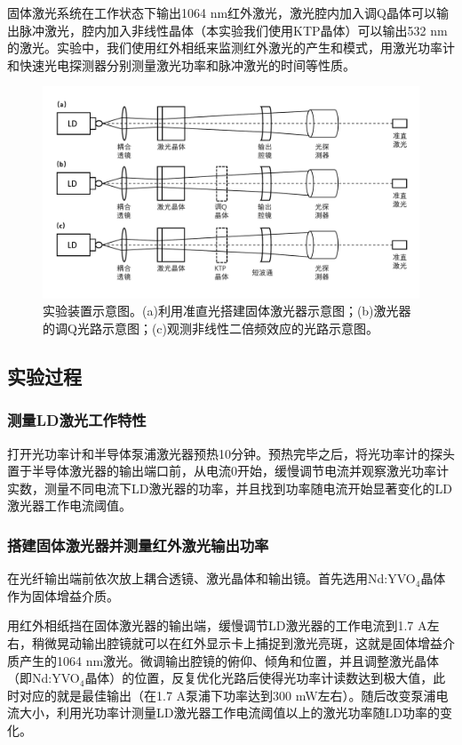 \documentclass{mpltx}
\begin{document}
固体激光系统在工作状态下输出1064 nm红外激光，激光腔内加入调Q晶体可以输出脉冲激光，腔内加入非线性晶体（本实验我们使用KTP晶体）可以输出532 nm的激光。实验中，我们使用红外相纸来监测红外激光的产生和模式，用激光功率计和快速光电探测器分别测量激光功率和脉冲激光的时间等性质。
\begin{figure}[h]
  \centering
  \setlength{\abovecaptionskip}{-0.4cm}
  \includegraphics[width=0.95\linewidth]{fig/apparatus.pdf}
  \caption{实验装置示意图。(a)利用准直光搭建固体激光器示意图；(b)激光器的调Q光路示意图；(c)观测非线性二倍频效应的光路示意图。}
  \label{apparatus}
\end{figure}
\subsection{实验过程}
\subsubsection{测量LD激光工作特性}
打开光功率计和半导体泵浦激光器预热10分钟。预热完毕之后，将光功率计的探头置于半导体激光器的输出端口前，从电流0开始，缓慢调节电流并观察激光功率计实数，测量不同电流下LD激光器的功率，并且找到功率随电流开始显著变化的LD激光器工作电流阈值。
\subsubsection{搭建固体激光器并测量红外激光输出功率}
在光纤输出端前依次放上耦合透镜、激光晶体和输出镜。首先选用Nd:YVO$_4$晶体作为固体增益介质。

用红外相纸挡在固体激光器的输出端，缓慢调节LD激光器的工作电流到1.7 A左右，稍微晃动输出腔镜就可以在红外显示卡上捕捉到激光亮斑，这就是固体增益介质产生的1064 nm激光。微调输出腔镜的俯仰、倾角和位置，并且调整激光晶体（即Nd:YVO$_4$晶体）的位置，反复优化光路后使得光功率计读数达到极大值，此时对应的就是最佳输出（在1.7 A泵浦下功率达到300 mW左右）。随后改变泵浦电流大小，利用光功率计测量LD激光器工作电流阈值以上的激光功率随LD功率的变化。
\end{document}
